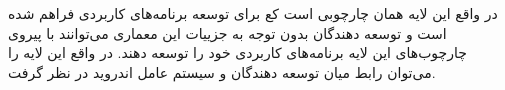 \SubProblem
{}
{
در واقع این لایه همان چارچوبی است کع برای توسعه برنامه‌های کاربردی فراهم شده است و توسعه دهندگان بدون توجه به جزییات این معماری می‌توانند با پیروی چارچوب‌های این لایه برنامه‌های کاربردی خود را توسعه دهند.
در واقع این لایه را می‌توان رابط میان توسعه دهندگان و سیستم عامل اندروید در نظر گرفت.
}
